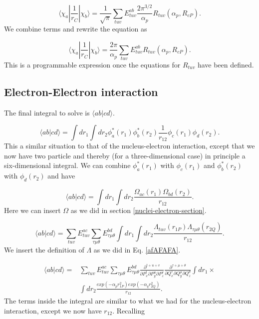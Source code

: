 \documentclass[a4paper,norsk,11pt,twoside]{report}
\begin{document}
\begin{equation}
\langle \chi_a | \frac{1}{r_C} | \chi_b \rangle = \frac{1}{\sqrt{\pi}} \sum_{tuv} E_{tuv}^{ab}  \frac{2 \pi^{3/2}}{\alpha_p} R_{tuv}(\alpha_p, R_{cP}) .
\end{equation}
We combine terms and rewrite the equation as

\begin{equation}
\langle \chi_a | \frac{1}{r_C} | \chi_b \rangle = 
\frac{2 \pi}{\alpha_p} 
\sum_{tuv} 
E_{tuv}^{ab} 
R_{tuv}(\alpha_p, R_{cP}) .
\label{final_nuclei_electron_thang}
\end{equation}
This is a programmable expression once the equations for $R_{tuv}$ have been defined.

\subsection{Electron-Electron interaction}
The final integral to solve is $\langle a b | c d \rangle$. 

\begin{equation}
\langle a b | c d \rangle = 
\int dr_1 \int dr_2 \phi_a^*(r_1) \phi_b^*(r_2) \frac{1}{r_{12}} \phi_c(r_1) \phi_d(r_2) .
\end{equation}
This a similar situation to that of the nucleus-electron interaction, except that we now have two particle and thereby (for a three-dimensional case) in principle a six-dimensional integral. 
We can combine $\phi_a^*(r_1)$ with $\phi_c(r_1)$ and $\phi_b^*(r_2)$ with $\phi_d(r_2)$ and have 

\begin{equation}
\langle a b | c d \rangle = \int dr_1 \int dr_2 \frac{\Omega_{ac}(r_1) \Omega_{bd}(r_2)}{r_{12}} .
\end{equation}
Here we can insert $\Omega$ as we did in section \ref{nuclei-electron-section}. 

\begin{equation}
\langle a b | c d \rangle = 
\sum_{tuv} E_{tuv}^{ac} \sum_{\tau \mu \theta} E_{\tau \mu \theta}^{bd}
\int dr_1 \int dr_2 \frac{\Lambda_{tuv}(r_{1P}) \Lambda_{\tau \mu \theta}(r_{2Q})}{r_{12}} .
\end{equation}
We insert the definition of $\Lambda$ as we did in Eq. \eqref{afAFAFA}. 

\begin{align}
\langle a b | c d \rangle = &
\sum_{tuv} E_{tuv}^{ac} \sum_{\tau \mu \theta} E_{\tau \mu \theta}^{bd} 
\frac{\partial^{t+u+v}}{\partial P_x^t \partial P_y^u \partial P_z^v}
\frac{\partial^{\tau+\mu+\theta}}{\partial Q_x^\tau \partial Q_y^\mu \partial Q_z^\theta}
\int dr_1 \times \nonumber \\  & 
\int dr_2 
\frac{exp(-\alpha_p r_{1P}^2) exp(-\alpha_q r_{2Q}^2)}{r_{12}} .
\end{align}
The terms inside the integral are similar to what we had for the nucleus-electron interaction, except we now have $r_{12}$. Recalling 
\end{document}
